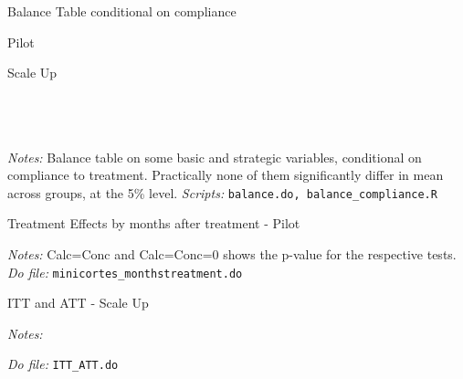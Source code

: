 \documentclass[11pt]{article}
\begin{document}
\begin{table}[H]
    \caption{Balance Table conditional on compliance}
    \label{Table_balance}
    \begin{subtable}{1\textwidth}
      \centering
        \caption{Pilot}
        \scriptsize{}
    \end{subtable}%
    
    \bigskip
    \begin{subtable}{1\textwidth}
      \centering
        \caption{Scale Up}
        \scriptsize{}
    \end{subtable}
           \footnotesize 
           \\
           \\
           \\
  \textit{Notes:} 
    Balance table on some basic and strategic variables, conditional on compliance to treatment. Practically none of them significantly differ in mean across groups, at the 5\% level.
    \textit{Scripts: } \texttt{balance.do, balance\_compliance.R}
\end{table}



\pagebreak

\begin{table}[H]
    \caption{Treatment Effects by months after treatment - Pilot}
    \label{Table_effects_F}
    \begin{center}
    \scriptsize{}
    \end{center}
    \footnotesize
    \textit{Notes:} 
    Calc=Conc and Calc=Conc=0 shows the p-value for the respective tests.
    \textit{Do file: } \texttt{minicortes\_monthstreatment.do}
\end{table}





\pagebreak




\begin{landscape}
\begin{table}[H]
    \caption{ITT and ATT - Scale Up}
    \label{ITT_ATT}
    \begin{center}
    \scriptsize{}
    \end{center}
    \footnotesize
    \textit{Notes:} 
    
    \textit{Do file: } \texttt{ITT\_ATT.do}
\end{table}
\end{landscape}
\end{document}
